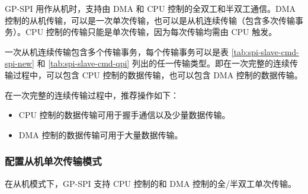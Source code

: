 \documentclass[main\_\_CN.tex]{subfiles}
\begin{document}
GP-SPI 用作从机时，支持由 DMA 和 CPU 控制的全双工和半双工通信。DMA 控制的从机传输，可以是一次单次传输，也可以是从机连续传输（包含多次传输事务）。CPU 控制的传输只能是单次传输，因为每次传输均需由 CPU 触发。

一次从机连续传输包含多个传输事务，每个传输事务可以是表  \ref{tab:spi-slave-cmd-spi-new} 和  \ref{tab:spi-slave-cmd-qpi} 列出的任一传输类型。即在一次完整的连续传输过程中，可以包含 CPU 控制的数据传输，也可以包含 DMA 控制的数据传输。

在一次完整的连续传输过程中，推荐操作如下：

\begin{itemize}
    \item CPU 控制的数据传输可用于握手通信以及少量数据传输。

    \item DMA 控制的数据传输可用于大量数据传输。
\end{itemize}


\subsubsection{配置从机单次传输模式}\label{GP-SPI2 slave single transfer}

在从机模式下，GP-SPI 支持 CPU 控制的和 DMA 控制的全/半双工单次传输。
\end{document}

